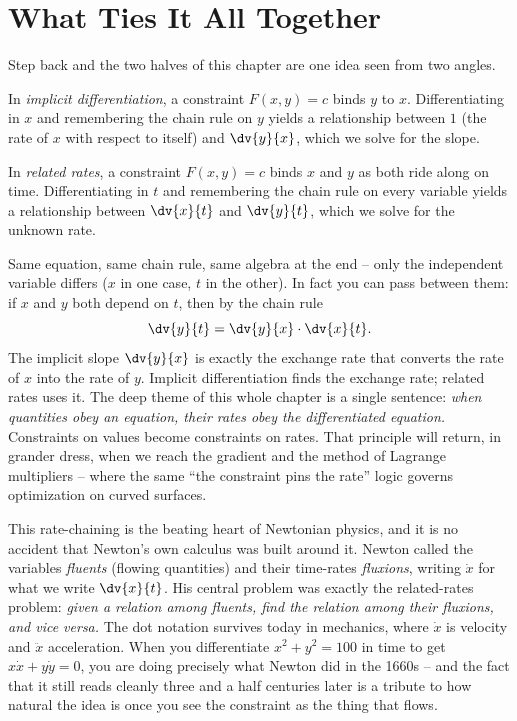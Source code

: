 \section{What Ties It All Together}
\label{ch13:synthesis}

Step back and the two halves of this chapter are one idea seen from two angles.

In \emph{implicit differentiation}, a constraint $F(x,y)=c$ binds $y$ to $x$. Differentiating in $x$
and remembering the chain rule on $y$ yields a relationship between $1$ (the rate of $x$ with respect
to itself) and $\dv{y}{x}$, which we solve for the slope.

In \emph{related rates}, a constraint $F(x,y)=c$ binds $x$ and $y$ as both ride along on time.
Differentiating in $t$ and remembering the chain rule on every variable yields a relationship between
$\dv{x}{t}$ and $\dv{y}{t}$, which we solve for the unknown rate.

\begin{aestheticbox}
Same equation, same chain rule, same algebra at the end -- only the independent variable differs ($x$
in one case, $t$ in the other). In fact you can pass between them: if $x$ and $y$ both depend on $t$,
then by the chain rule
\[
\dv{y}{t} = \dv{y}{x}\cdot\dv{x}{t}.
\]
The implicit slope $\dv{y}{x}$ is exactly the exchange rate that converts the rate of $x$ into the
rate of $y$. Implicit differentiation finds the exchange rate; related rates uses it. The deep theme
of this whole chapter is a single sentence: \emph{when quantities obey an equation, their rates obey
the differentiated equation.} Constraints on values become constraints on rates. That principle will
return, in grander dress, when we reach the gradient and the method of Lagrange multipliers --
where the same ``the constraint pins the rate'' logic governs optimization on curved surfaces.
\end{aestheticbox}

\begin{historybox}
This rate-chaining is the beating heart of Newtonian physics, and it is no accident that Newton's own
calculus was built around it. Newton called the variables \emph{fluents} (flowing quantities) and
their time-rates \emph{fluxions}, writing $\dot{x}$ for what we write $\dv{x}{t}$. His central problem
was exactly the related-rates problem: \emph{given a relation among fluents, find the relation among
their fluxions, and vice versa.} The dot notation survives today in mechanics, where $\dot{x}$ is
velocity and $\ddot{x}$ acceleration. When you differentiate $x^2+y^2=100$ in time to get $x\dot{x} +
y\dot{y} = 0$, you are doing precisely what Newton did in the 1660s -- and the fact that it still
reads cleanly three and a half centuries later is a tribute to how natural the idea is once you see
the constraint as the thing that flows.
\end{historybox}

